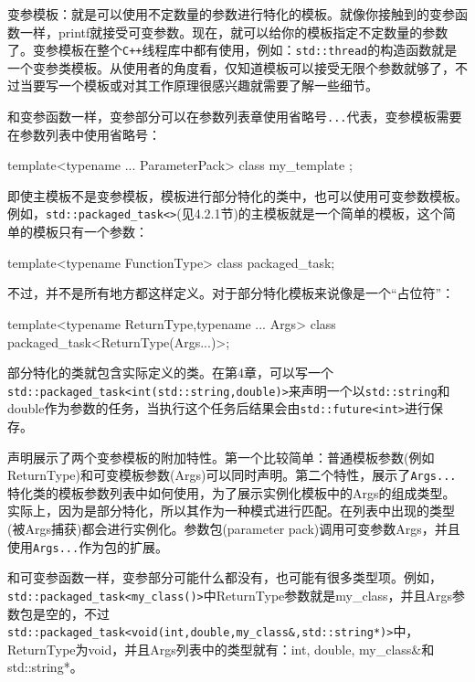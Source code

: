 
变参模板：就是可以使用不定数量的参数进行特化的模板。就像你接触到的变参函数一样，printf就接受可变参数。现在，就可以给你的模板指定不定数量的参数了。变参模板在整个\texttt{C++}线程库中都有使用，例如：\texttt{std::thread}的构造函数就是一个变参类模板。从使用者的角度看，仅知道模板可以接受无限个参数就够了，不过当要写一个模板或对其工作原理很感兴趣就需要了解一些细节。

和变参函数一样，变参部分可以在参数列表章使用省略号\texttt{...}代表，变参模板需要在参数列表中使用省略号：

\begin{cpp}
template<typename ... ParameterPack>
class my_template
{};
\end{cpp}

即使主模板不是变参模板，模板进行部分特化的类中，也可以使用可变参数模板。例如，\texttt{std::packaged\_task<>}(见4.2.1节)的主模板就是一个简单的模板，这个简单的模板只有一个参数：

\begin{cpp}
template<typename FunctionType>
class packaged_task;
\end{cpp}

不过，并不是所有地方都这样定义。对于部分特化模板来说像是一个“占位符”：

\begin{cpp}
template<typename ReturnType,typename ... Args>
class packaged_task<ReturnType(Args...)>;
\end{cpp}

部分特化的类就包含实际定义的类。在第4章，可以写一个\texttt{std::packaged\_task<int(std::string,double)>}来声明一个以\texttt{std::string}和double作为参数的任务，当执行这个任务后结果会由\texttt{std::future<int>}进行保存。

声明展示了两个变参模板的附加特性。第一个比较简单：普通模板参数(例如ReturnType)和可变模板参数(Args)可以同时声明。第二个特性，展示了\texttt{Args...}特化类的模板参数列表中如何使用，为了展示实例化模板中的Args的组成类型。实际上，因为是部分特化，所以其作为一种模式进行匹配。在列表中出现的类型(被Args捕获)都会进行实例化。参数包(parameter pack)调用可变参数Args，并且使用\texttt{Args...}作为包的扩展。

和可变参函数一样，变参部分可能什么都没有，也可能有很多类型项。例如，\texttt{std::packaged\_task<my\_class()>}中ReturnType参数就是my\_class，并且Args参数包是空的，不过\texttt{std::packaged\_task<void(int,double,my\_class\&,std::string*)>}中，ReturnType为void，并且Args列表中的类型就有：int, double, my\_class\&和std::string*。


